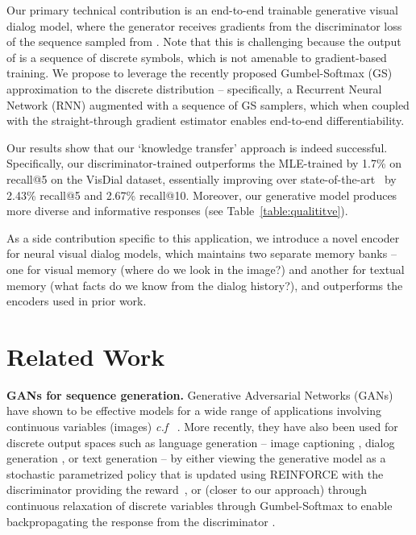 \documentclass{article}
\begin{document}
Our primary technical contribution is an end-to-end trainable generative visual dialog model, 
where the generator receives gradients from the discriminator loss of the sequence sampled from . 
Note that this is challenging because the output of  is a sequence of discrete symbols, which \naively is not amenable to gradient-based training. 
We propose to leverage the recently proposed Gumbel-Softmax (GS) approximation to the discrete distribution \cite{jang2016categorical, maddison2016concrete} -- 
specifically, a Recurrent Neural Network (RNN) augmented with a sequence of GS samplers, which when coupled with the straight-through gradient estimator 
\cite{BengioLC13, jang2016categorical} enables end-to-end differentiability. 



Our results show that our `knowledge transfer' approach is indeed successful. Specifically, our discriminator-trained 
 outperforms the MLE-trained  by 1.7\% on recall@5 on the VisDial dataset, essentially improving over state-of-the-art~\cite{visdial} by 2.43\% recall@5 and 2.67\% recall@10. Moreover, our generative model produces more diverse and informative responses (see Table~\ref{table:qualititve}). 

As a side contribution specific to this application, we introduce a novel encoder 
for neural visual dialog models, which maintains two 
separate memory banks -- one for visual memory (where do we look in the image?) and another 
for textual memory (what facts do we know from the dialog history?), and outperforms the encoders used in prior work. 


 \section{Related Work}
\label{sec:related}



{\bf GANs for sequence generation.}
Generative Adversarial Networks (GANs) \cite{goodfellow2014generative} have shown to be effective models for a wide range of 
applications involving continuous variables (\eg images) {\it c.f} ~\cite{DentonCSF15,dcgan,LedigTHCATTWS16,CycleGAN2017}. 
More recently, they have also been used for discrete
output spaces such as language generation -- \eg image 
captioning \cite{dai2017towards,ShettyRHFS17}, dialog generation 
 \cite{li2017adversarial}, or text generation \cite{yu2017seqgan} -- by either viewing the generative model 
as a stochastic parametrized policy that is updated using REINFORCE with the discriminator providing 
the reward~\cite{yu2017seqgan,dai2017towards,ShettyRHFS17,li2017adversarial}, or (closer to our approach) through continuous
relaxation of discrete variables through Gumbel-Softmax to enable backpropagating the response from 
the discriminator \cite{Kusner16, ShettyRHFS17}.
\end{document}
